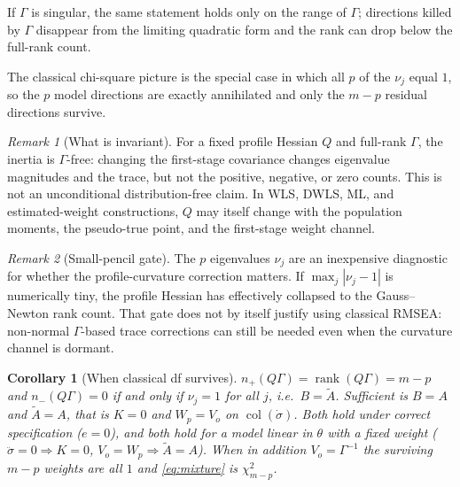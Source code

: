 \documentclass[11pt]{article}
\newcommand{\rank}{\operatorname{rank}}
\newcommand{\np}{n_{+}}
\newcommand{\nm}{n_{-}}
\theoremstyle{plain}
\newtheorem{corollary}{Corollary}
\theoremstyle{remark}
\newtheorem*{remark}{Remark}
\begin{document}
If $\Gamma$ is singular, the same statement holds only on the range of
$\Gamma$; directions killed by $\Gamma$ disappear from the limiting quadratic
form and the rank can drop below the full-rank count.

The classical chi-square picture is the special case in which all $p$ of the
$\nu_j$ equal $1$, so the $p$ model directions are exactly annihilated and only
the $m-p$ residual directions survive.

\begin{remark}[What is invariant]\label{rem:invariant}
For a fixed profile Hessian $Q$ and full-rank $\Gamma$, the inertia is
$\Gamma$-free: changing the first-stage covariance changes eigenvalue
magnitudes and the trace, but not the positive, negative, or zero counts. This
is not an unconditional distribution-free claim. In WLS, DWLS, ML, and
estimated-weight constructions, $Q$ may itself change with the population
moments, the pseudo-true point, and the first-stage weight channel.
\end{remark}

\begin{remark}[Small-pencil gate]\label{rem:gate}
The $p$ eigenvalues $\nu_j$ are an inexpensive diagnostic for whether the
profile-curvature correction matters. If $\max_j|\nu_j-1|$ is numerically tiny,
the profile Hessian has effectively collapsed to the Gauss--Newton rank count.
That gate does not by itself justify using classical RMSEA: non-normal
$\Gamma$-based trace corrections can still be needed even when the curvature
channel is dormant.
\end{remark}

\begin{corollary}[When classical df survives]\label{cor:classical}
$\np(Q\Gamma)=\rank(Q\Gamma)=m-p$ and $\nm(Q\Gamma)=0$ if and only if
$\nu_j=1$ for all $j$, i.e.\ $B=\tilde A$. Sufficient is $B=A$ and
$\tilde A=A$, that is $K=0$ \emph{and} $W_{\!p}=V_{\!o}$ on
$\operatorname{col}(\dot\sigma)$. Both hold under correct specification ($e=0$),
and both hold for a model linear in $\theta$ with a fixed weight ($\ddot\sigma=0
\Rightarrow K=0$, $V_{\!o}=W_{\!p}\Rightarrow\tilde A=A$). When in addition
$V_{\!o}=\Gamma^{-1}$ the surviving $m-p$ weights are all $1$ and
\eqref{eq:mixture} is $\chi^2_{m-p}$.
\end{corollary}
\end{document}
